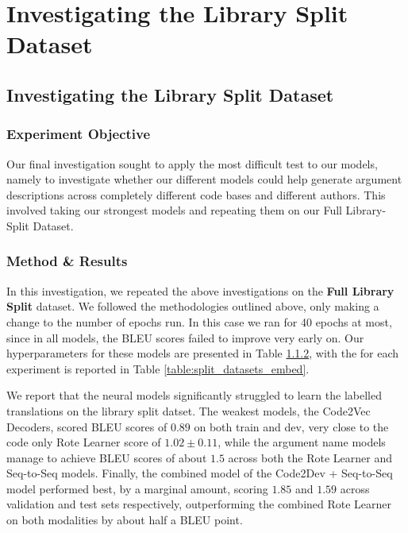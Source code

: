 \section{Investigating the Library Split Dataset} %
\label{sec:analysis}

\subsection{Investigating the Library Split Dataset} %

\subsubsection{Experiment Objective} %

Our final investigation sought to apply the most difficult test to our models, namely to investigate whether our different models could help generate argument descriptions across completely different code bases and different authors.
This involved taking our strongest models and repeating them on our Full Library-Split Dataset.

\subsubsection{Method \& Results}  %

In this investigation, we repeated the above investigations on the \textbf{Full Library Split} dataset. 
We followed the methodologies outlined above, only making a change to the number of epochs run.
In this case we ran for 40 epochs at most, since in all models, the BLEU scores failed to improve very early on. 
Our hyperparameters for these models are presented in Table \ref{}, with the for each experiment is reported in Table \ref{table:split_datasets_embed}.

We report that the neural models significantly struggled to learn the labelled translations on the library split datset.
The weakest models, the Code2Vec Decoders, scored BLEU scores of $0.89$ on both train and dev, very close to the code only Rote Learner score of   $ 1.02 \pm  0.11$, while the argument name models manage to achieve BLEU scores of about $1.5$ across both the Rote Learner and Seq-to-Seq models. 
Finally, the combined model of the Code2Dev + Seq-to-Seq model performed best, by a marginal amount, scoring  $ 1.85 $ and $ 1.59 $ across validation and test sets respectively,  outperforming the combined Rote Learner on both modalities by about half a BLEU point.



